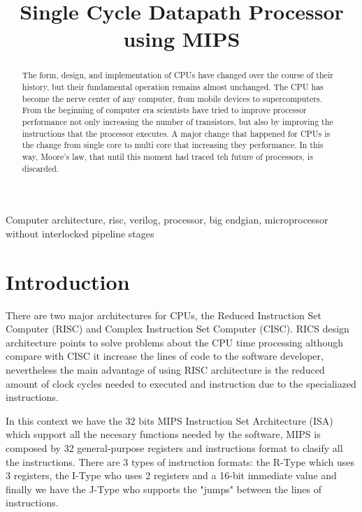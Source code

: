 \documentclass[conference]{IEEEtran}
\begin{document}
\title{Single Cycle Datapath Processor using MIPS\\
}

\author{
}

\maketitle

\begin{abstract}
The form, design, and implementation of CPUs have changed over the course of their history, but their
fundamental operation remains almost unchanged. The CPU has become the nerve center of any computer,
from mobile devices to supercomputers. From the beginning	of computer era scientists have tried to improve
processor performance not only increasing the number of transistors, but also by improving the instructions
that the processor executes. A major change that happened for CPUs is the change from single core to multi core
that increasing they performance. In this way, Moore's law, that until this moment had traced teh future of processors,
is discarded.
\end{abstract}

\begin{IEEEkeywords}
Computer architecture, risc, verilog, processor, big endgian, microprocessor without interlocked pipeline stages
\end{IEEEkeywords}

\section{Introduction}	%
There are two major architectures for CPUs, the Reduced Instruction Set Computer (RISC) and Complex 
Instruction Set Computer (CISC). RICS design architecture points to solve problems about the CPU time 
processing  although compare with CISC it increase the lines of code to the software developer, nevertheless 
the main advantage of using RISC architecture is the reduced amount of clock cycles needed to executed 
and instruction due to the specialiazed instructions.

In this context we have the 32 bits MIPS Instruction Set Architecture (ISA) \cite{b1} which support all the necesary functions
needed by the software, MIPS is composed by 32 general-purpose registers and instructions format to clasify
all the instructions. There are 3 types of instruction formats: the R-Type which uses 3 registers, the I-Type who uses 2
registers and a 16-bit immediate value and finally we have the J-Type who supports the "jumps" between the lines of
instructions. 
\end{document}
